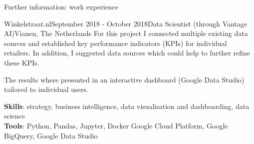 \begin{rSection}{Further information: work experience}
\begin{rSubsection}{Winkelstraat.nl}{September 2018 - October 2018}{Data Scientist (through Vantage AI)}{Vianen, The Netherlands}
For this project I connected multiple existing data sources and established key performance indicators (KPIs) for individual retailers.
In addition, I suggested data sources which could help to further refine these KPIs.

The results where presented in an interactive dashboard (Google Data Studio) tailored to individual users.

{\bf Skills}: strategy, business intelligence, data visualisation and dashboarding, data science\\
{\bf Tools}: Python, Pandas, Jupyter, Docker Google Cloud Platform, Google BigQuery, Google Data Studio
%
\end{rSubsection}
\end{rSection}



